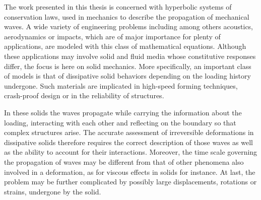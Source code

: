 The work presented in this thesis is concerned with hyperbolic systems of conservation laws, used in mechanics to describe the propagation of mechanical waves.
A wide variety of engineering problems including among others acoustics, aerodynamics or impacts, which are of major importance for plenty of applications, are modeled with this class of mathematical equations. 
Although these applications may involve solid and fluid media whose constitutive responses differ, the focus is here on solid mechanics.
More specifically, an important class of models is that of dissipative solid behaviors depending on the loading history undergone.
Such materials are implicated in high-speed forming techniques, crash-proof design or in the reliability of structures.

In these solids the waves propagate while carrying the information about the loading, interacting with each other and reflecting on the boundary so that complex structures arise.
The accurate assessment of irreversible deformations in dissipative solids therefore requires the correct description of those waves as well as the ability to account for their interactions.
Moreover, the time scale governing the propagation of waves may be different from that of other phenomena also involved in a deformation, as for viscous effects in solids for instance.
At last, the problem may be further complicated by possibly large displacements, rotations or strains, undergone by the solid.


